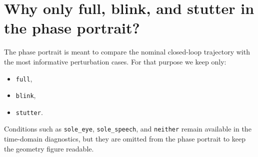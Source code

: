 \section{Why only full, blink, and stutter in the phase portrait?}

The phase portrait is meant to compare the nominal closed-loop trajectory with the most informative perturbation cases. For that purpose we keep only:
\begin{itemize}
    \item \texttt{full},
    \item \texttt{blink},
    \item \texttt{stutter}.
\end{itemize}

Conditions such as \texttt{sole\_eye}, \texttt{sole\_speech}, and \texttt{neither} remain available in the time-domain diagnostics, but they are omitted from the phase portrait to keep the geometry figure readable.
